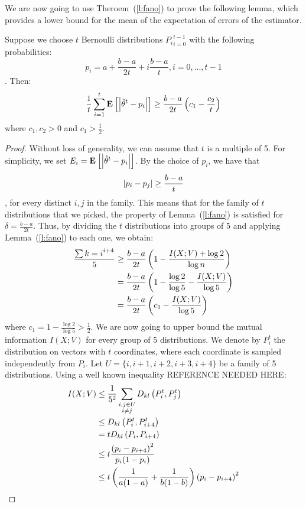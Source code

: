 We are now going to use Theroem~(\ref{l:fano}) to prove the following lemma, which provides a lower bound for the mean of the expectation of errors of the estimator.
\begin{lemma}\label{l:fano_application}
Suppose we choose $t$ Bernoulli distributions ${P_i}_{i=0}^{t-1}$ with the following probabilities: $$p_i = a+\frac{b-a}{2t} + i \frac{b-a}{t} , i=0, ..., t-1$$. Then:
$$\frac{1}{t} \sum_{i=1}^t \Exp{\lp|\hat{\theta}^t-p_i\rp|} \geq \frac{b-a}{2t} \lp(c_1 - \frac{c_2}{t}\rp)$$
where $c_1, c_2 >0$ and $c_1 > \frac{1}{2}$.
\end{lemma}
\begin{proof}
Without loss of generality, we can assume that $t$ is a multiple of 5. For simplicity, we set $E_i = \Exp{\lp|\hat{\theta}^t-p_i\rp|}$.
By the choice of $p_i$, we have that $$\left|p_i - p_j\right| \geq \frac{b-a}{t}$$, for every distinct $i,j$ in the family.
 This means that for the family of $t$ distributions that we picked, the property of Lemma~(\ref{l:fano}) is satisfied for $\delta = \frac{b-a}{2t}$. Thus, by dividing the $t$ distributions into groups of 5 and applying Lemma~(\ref{l:fano}) to each one, we obtain:
 \begin{align}\label{eq:fano}
 \frac{\sum{k =i}^{i+4}}{5} &\geq \frac{b-a}{2t}\left(1-\frac{I(X;V)+\log 2}{\log n}\right) \nonumber\\
 &= \frac{b-a}{2t}\left(1- \frac{\log 2}{\log 5} - \frac{I(X;V)}{\log5}\right) \nonumber\\
 &= \frac{b-a}{2t}\left(c_1 - \frac{I(X;V)}{\log5}\right)
 \end{align}
 where $c_1 = 1-\frac{\log2}{\log5} > \frac{1}{2}$. 
 We are now going to upper bound the mutual information $I(X;V)$ for every group of 5 distributions. We denote by $P_i^t$ the distribution on vectors with $t$ coordinates,
  where each coordinate is sampled independently from $P_i$. Let $U= \{i,i+1,i+2,i+3,i+4\}$ be a family of 5 distributions.
 Using a well known inequality REFERENCE NEEDED HERE:
\begin{align*}
I(X;V) &\leq \frac{1}{5^2}\sum_{\substack{i,j \in U \\i\neq j}} D_{kl}\lp(P_i^t,P_j^t\rp)\\
&\leq D_{kl}\lp(P_i^t, P_{i+4}^t\rp)\\
&= t D_{kl}\lp(P_i, P_{i+4}\rp)\\
&\leq t \frac{\lp(p_i - p_{i+4}\rp)^2}{p_i(1-p_i)}\\
&\leq t\lp(\frac{1}{a(1-a)} + \frac{1}{b(1-b)}\rp) \lp(p_i - p_{i+4}\rp)^2\\

\end{align*}
\end{proof}
